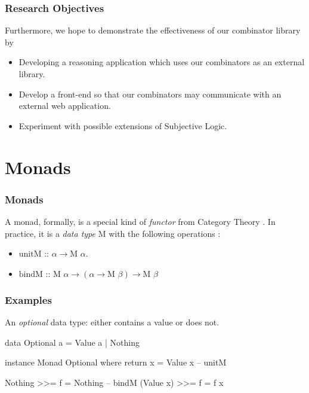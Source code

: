 \documentclass{beamer}
\begin{document}

\begin{frame}
\frametitle{Research Objectives}

Furthermore, we hope to demonstrate the effectiveness of our combinator
library by

\begin{itemize}
  \item Developing a reasoning application which uses our combinators as an
    external library.
  \item Develop a front-end so that our combinators may communicate
    with an external web application.
  \item Experiment with possible extensions of Subjective Logic.
\end{itemize}

\end{frame}

%
%

\section{Monads}

\begin{frame}
\frametitle{Monads}

A monad, formally, is a special kind of \emph{functor} from Category Theory \cite{mac1998categories}. In
practice, it is a \emph{data type} M with the following operations \cite{Wadler:1992:EFP:143165.143169}:

\begin{itemize}
  \item $\mbox{unitM :: } \alpha \rightarrow \mbox{M } \alpha$.
  \item $\mbox{bindM :: } \mbox{M } \alpha \rightarrow \left(\alpha \rightarrow \mbox{M } \beta\right) \rightarrow \mbox{M } \beta$
\end{itemize}

\end{frame}


\begin{frame}[fragile]
\frametitle{Examples}

An \emph{optional} data type: either contains a value or does not.

\begin{code}
data Optional a = Value a | Nothing

instance Monad Optional where
  return x = Value x        -- unitM

  Nothing   >>= f = Nothing -- bindM
  (Value x) >>= f = f x
\end{code}

\end{frame}
\end{document}
